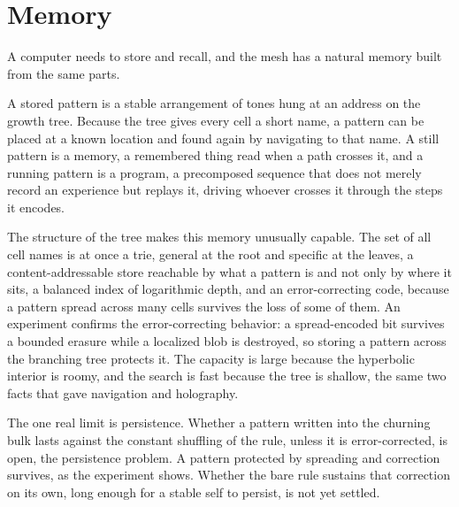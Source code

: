 \section{Memory}

A computer needs to store and recall, and the mesh has a natural memory built from the same parts.

A stored pattern is a stable arrangement of tones hung at an address on the growth tree. Because the tree gives every
cell a short name, a pattern can be placed at a known location and found again by navigating to that name. A still
pattern is a memory, a remembered thing read when a path crosses it, and a running pattern is a program, a precomposed
sequence that does not merely record an experience but replays it, driving whoever crosses it through the steps it
encodes.

The structure of the tree makes this memory unusually capable. The set of all cell names is at once a trie, general at
the root and specific at the leaves, a content-addressable store reachable by what a pattern is and not only by where it
sits, a balanced index of logarithmic depth, and an error-correcting code, because a pattern spread across many cells
survives the loss of some of them. An experiment confirms the error-correcting behavior: a spread-encoded bit survives a
bounded erasure while a localized blob is destroyed, so storing a pattern across the branching tree protects it. The
capacity is large because the hyperbolic interior is roomy, and the search is fast because the tree is shallow, the same
two facts that gave navigation and holography.

The one real limit is persistence. Whether a pattern written into the churning bulk lasts against the constant shuffling
of the rule, unless it is error-corrected, is open, the persistence problem. A pattern protected by spreading and
correction survives, as the experiment shows. Whether the bare rule sustains that correction on its own, long enough for
a stable self to persist, is not yet settled.
